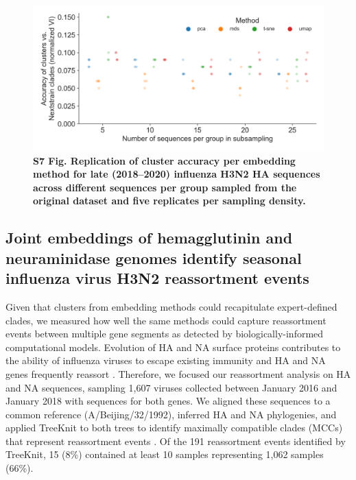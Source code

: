 \documentclass[10pt,letterpaper]{article}
\begin{document}
\begin{figure}[!h]
\includegraphics[width=\columnwidth]{figures/flu-2018-2020-replication-of-cluster-accuracy.png}
\caption*{{\bf S7 Fig. Replication of cluster accuracy per embedding method for late (2018--2020) influenza H3N2 HA sequences across different sequences per group sampled from the original dataset and five replicates per sampling density.}}
\end{figure}

\subsection*{Joint embeddings of hemagglutinin and neuraminidase genomes identify seasonal influenza virus H3N2 reassortment events}

Given that clusters from embedding methods could recapitulate expert-defined clades, we measured how well the same methods could capture reassortment events between multiple gene segments as detected by biologically-informed computational models.
Evolution of HA and NA surface proteins contributes to the ability of influenza viruses to escape existing immunity \cite{Petrova2018} and HA and NA genes frequently reassort \cite{Nelson2008,Marshall2013,Potter2019}.
Therefore, we focused our reassortment analysis on HA and NA sequences, sampling 1,607 viruses collected between January 2016 and January 2018 with sequences for both genes.
We aligned these sequences to a common reference (A/Beijing/32/1992), inferred HA and NA phylogenies, and applied TreeKnit to both trees to identify maximally compatible clades (MCCs) that represent reassortment events \cite{Barrat-Charlaix2022}.
Of the 191 reassortment events identified by TreeKnit, 15 (8\%) contained at least 10 samples representing 1,062 samples (66\%).
\end{document}
